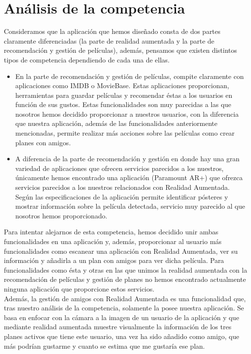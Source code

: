 \section{Análisis de la competencia}
\label{makereference3.1}
\begin{flushleft}
    Consideramos que la aplicación que hemos diseñado consta de dos partes claramente diferenciadas (la parte de realidad aumentada
    y la parte de recomendación y gestión de películas), además, pensamos que existen distintos tipos de competencia dependiendo de cada una de ellas.
     \begin{itemize}  
         \item En la parte de recomendación y gestión de películas, compite claramente con aplicaciones como IMDB\cite{imdb} o MovieBase\cite{moviebase}. 
         Estas aplicaciones proporcionan, herramientas para guardar películas y recomendar éstas a los usuarios en función de sus gustos. Estas funcionalidades son 
         muy parecidas a las que nosotros hemos decidido proporcionar a nuestros usuarios, con la diferencia que nuestra aplicación, además de las funcionalidades anteriormente 
         mencionadas, permite realizar más acciones sobre las películas como crear planes con amigos.
        \item A diferencia de la parte de recomendación y gestión en donde hay una gran variedad de aplicaciones que ofrecen servicios parecidos a los nuestros, únicamente hemos 
        encontrado una aplicación (Paramount AR+\cite{paramountar}) que ofrezca servicios parecidos a los nuestros relacionados con Realidad Aumentada. Según las especificaciones de la aplicación permite identificar pósteres y 
        mostrar información sobre la película detectada, servicio muy parecido al que nosotros hemos proporcionado. 
    \end{itemize}
    Para intentar alejarnos de esta competencia, hemos decidido unir ambas funcionalidades en una aplicación y, además, proporcionar al usuario más funcionalidades como escanear una aplicación con Realidad Aumentada, 
    ver su información y añadirla a un plan con amigos para ver dicha película. Para funcionalidades como ésta y otras en las que unimos la realidad aumentada con la recomendación de películas y gestión de planes no hemos encontrado actualmente ninguna aplicación que proporcione estos servicios.
    \\
    Además, la gestión de amigos con Realidad Aumentada es una funcionalidad que, tras nuestro análisis de la competencia, solamente la posee nuestra aplicación. 
    Se basa en enfocar con la cámara a la imagen de un usuario de la aplicación y que mediante realidad aumentada muestre visualmente la información de los tres 
    planes activos que tiene este usuario, una vez ha sido añadido como amigo, que más podrían gustarme y cuanto se estima que me gustaría ese plan.
    
\end{flushleft}
